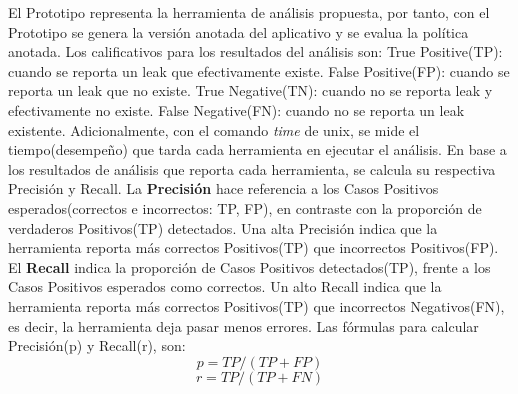 El Prototipo representa la herramienta de análisis propuesta, por tanto, con el
Prototipo se genera la versión anotada del aplicativo y se evalua la política
anotada.\newline
Los calificativos para los resultados del análisis son:  
True Positive(TP): cuando se reporta un leak que efectivamente existe. 
False Positive(FP): cuando se reporta un leak que no existe.  
True Negative(TN): cuando no se reporta leak y efectivamente no existe. 
False Negative(FN): cuando no se reporta un leak existente.\newline
Adicionalmente, con el comando \textit{time}\cite{time-man} de unix, se mide el
tiempo(desempeño) que tarda cada herramienta en ejecutar el análisis.\newline
En base a los resultados de análisis que reporta cada herramienta, se
calcula su respectiva Precisión y Recall.\newline
La \textbf{Precisión} hace referencia a los Casos Positivos esperados(correctos
e incorrectos: TP, FP), en contraste con la proporción de verdaderos Positivos(TP)
detectados\cite{Precision-Recall}. Una alta Precisión indica que la herramienta
reporta más correctos Positivos(TP) que incorrectos Positivos(FP).\newline 
El \textbf{Recall} indica la proporción de Casos Positivos detectados(TP),
frente a los Casos Positivos esperados como correctos\cite{Precision-Recall}. Un
alto Recall indica que la herramienta reporta más correctos Positivos(TP) que incorrectos
Negativos(FN), es decir, la herramienta deja pasar menos errores.\newline
Las fórmulas para calcular Precisión(p) y Recall(r), son:
\begin{equation}
\label{pre}
	p = TP/(TP +FP) 
\end{equation}
\begin{equation}
\label{rec}
	r = TP/(TP+FN)
\end{equation}
